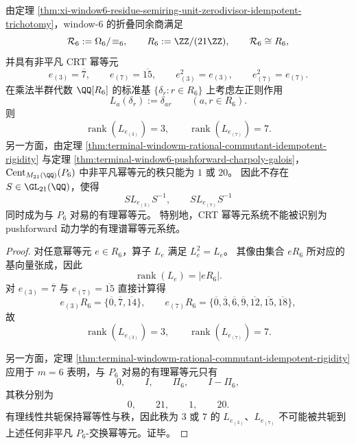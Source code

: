 \begin{theorem}\label{thm:conclusion-window6-crt-spectral-idempotent-rank-mismatch}
由定理 \ref{thm:xi-window6-residue-semiring-unit-zerodivisor-idempotent-trichotomy}，window-\(6\) 的折叠同余商满足
\[
\mathcal R_6:=\Omega_6/\!\equiv_6,
\qquad
R_6:=\ZZ/(21\ZZ),
\qquad
\mathcal R_6\cong R_6,
\]
并具有非平凡 CRT 幂等元
\[
e_{(3)}=\overline 7,
\qquad
e_{(7)}=\overline{15},
\qquad
e_{(3)}^2=e_{(3)},
\qquad
e_{(7)}^2=e_{(7)}.
\]
在乘法半群代数 \(\QQ[R_6]\) 的标准基 \(\{\delta_r:r\in R_6\}\) 上考虑左正则作用
\[
L_a(\delta_r):=\delta_{ar}
\qquad
(a,r\in R_6).
\]
则
\[
\operatorname{rank}(L_{e_{(3)}})=3,
\qquad
\operatorname{rank}(L_{e_{(7)}})=7.
\]
另一方面，由定理 \ref{thm:terminal-windowm-rational-commutant-idempotent-rigidity} 与定理 \ref{thm:terminal-window6-pushforward-charpoly-galois}，\(\operatorname{Cent}_{M_{21}(\QQ)}(P_6)\) 中非平凡幂等元的秩只能为 \(1\) 或 \(20\)。
因此不存在 \(S\in \GL_{21}(\QQ)\)，使得
\[
S L_{e_{(3)}}S^{-1},
\qquad
S L_{e_{(7)}}S^{-1}
\]
同时成为与 \(P_6\) 对易的有理幂等元。
特别地，CRT 幂等元系统不能被识别为 pushforward 动力学的有理谱幂等元系统。
\end{theorem}
\begin{proof}
对任意幂等元 \(e\in R_6\)，算子 \(L_e\) 满足 \(L_e^2=L_e\)。
其像由集合 \(eR_6\) 所对应的基向量张成，因此
\[
\operatorname{rank}(L_e)=|eR_6|.
\]
对 \(e_{(3)}=\overline 7\) 与 \(e_{(7)}=\overline{15}\) 直接计算得
\[
e_{(3)}R_6=\{\overline 0,\overline 7,\overline{14}\},
\qquad
e_{(7)}R_6=\{\overline 0,\overline 3,\overline 6,\overline 9,\overline{12},\overline{15},\overline{18}\},
\]
故
\[
\operatorname{rank}(L_{e_{(3)}})=3,
\qquad
\operatorname{rank}(L_{e_{(7)}})=7.
\]

另一方面，定理 \ref{thm:terminal-windowm-rational-commutant-idempotent-rigidity} 应用于 \(m=6\) 表明，与 \(P_6\) 对易的有理幂等元只有
\[
0,\qquad I,\qquad \Pi_6,\qquad I-\Pi_6,
\]
其秩分别为
\[
0,\qquad 21,\qquad 1,\qquad 20.
\]
有理线性共轭保持幂等性与秩，因此秩为 \(3\) 或 \(7\) 的 \(L_{e_{(3)}}\)、\(L_{e_{(7)}}\) 不可能被共轭到上述任何非平凡 \(P_6\)-交换幂等元。证毕。
\end{proof}

